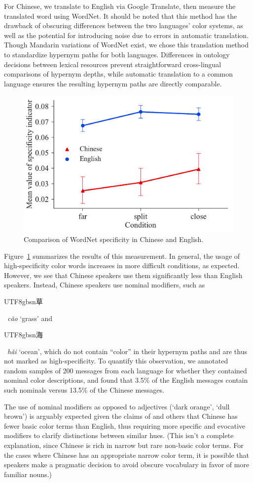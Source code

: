\documentclass[11pt,a4paper]{article}
\newenvironment{zh}{\begin{CJK}{UTF8}{gbsn}}{\end{CJK}}
\newcommand{\textzh}[2]{\begin{zh}#1\end{zh}~\emph{#2}}
\renewcommand{\|}{\mid}
\newcommand{\Figref}[1]{Figure~\ref{#1}}
\begin{document}
For Chinese, we translate to English via Google Translate, then measure the translated word using WordNet. It should be noted that this method has the drawback of obscuring differences between the two languages' color systems, as well as the potential for introducing noise due to errors in automatic translation. Though Mandarin variations of WordNet exist, we chose this translation method to standardize hypernym paths for both languages. Differences in ontology decisions between lexical resources prevent straightforward cross-lingual comparisons of hypernym depths, while automatic translation to a common language ensures the resulting hypernym paths are directly comparable.

\begin{figure}[!t]
    \centering
    \includegraphics[width=0.8\columnwidth]{specificity.pdf}
    \caption{Comparison of WordNet specificity in Chinese and English.}
    \label{fig:specificity}
\end{figure}

\Figref{fig:specificity} summarizes the results of this measurement. In general, the usage of high-specificity color words increases in more difficult conditions, as expected. However, we see that Chinese speakers use them significantly less than English speakers. Instead, Chinese speakers use nominal modifiers, such as \textzh{草}{c\v{a}o} `grass' and \textzh{海}{h\v{a}i} `ocean', which do not contain ``color'' in their hypernym paths and are thus not marked as high-specificity. 
To quantify this observation, we annotated random samples of 200 messages from each language for whether they contained nominal color descriptions, and found that 3.5\% of the English messages contain such nominals versus 13.5\% of the Chinese messages.

The use of nominal modifiers as opposed to adjectives (`dark orange', `dull brown') is arguably expected given the claims of \citet{BerlinKay1969} and others that Chinese has fewer basic color terms than English, thus requiring more specific and evocative modifiers to clarify distinctions between similar hues. (This isn't a complete explanation, since Chinese is rich in narrow but rare non-basic color terms. For the cases where Chinese has an appropriate narrow color term, it is possible that speakers make a pragmatic decision to avoid obscure vocabulary in favor of more familiar nouns.)
\end{document}
